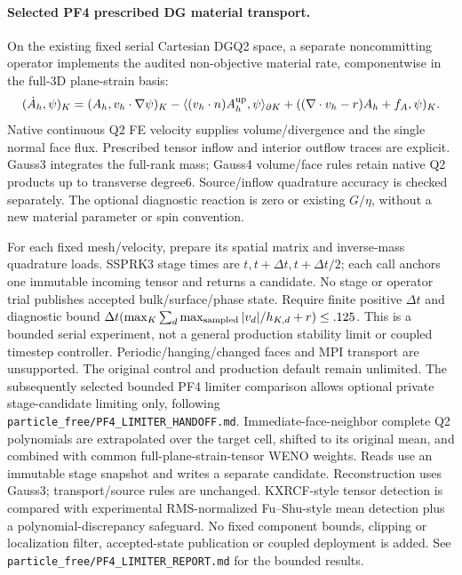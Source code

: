 \documentclass[11pt]{article}
\begin{document}
\paragraph{Selected PF4 prescribed DG material transport.}
On the existing fixed serial Cartesian DGQ2 space, a separate noncommitting
operator implements the audited non-objective material rate, componentwise in
the full-3D plane-strain basis:
\[
 (\dot A_h,\psi)_K=(A_h,v_h\cdot\nabla\psi)_K
 -\langle(v_h\cdot n)A_h^{\rm up},\psi\rangle_{\partial K}
 +((\nabla\cdot v_h-r)A_h+f_A,\psi)_K.
\]
Native continuous Q2 FE velocity supplies volume/divergence and the single
normal face flux. Prescribed tensor inflow and interior outflow traces are
explicit. Gauss3 integrates the full-rank mass; Gauss4 volume/face rules retain
native Q2 products up to transverse degree6. Source/inflow quadrature accuracy
is checked separately. The optional diagnostic reaction is zero or existing
$G/\eta$, without a new material parameter or spin convention.

For each fixed mesh/velocity, prepare its spatial matrix and inverse-mass
quadrature loads. SSPRK3 stage times are $t,t+\Delta t,t+\Delta t/2$; each call
anchors one immutable incoming tensor and returns a candidate. No stage or
operator trial publishes accepted bulk/surface/phase state. Require finite
positive $\Delta t$ and diagnostic bound
$\Delta t(\max_K\sum_d\max_{\rm sampled}|v_d|/h_{K,d}+r)\le .125$.
This is a bounded serial experiment, not a general production stability limit
or coupled timestep controller. Periodic/hanging/changed faces and MPI transport
are unsupported. The original control and production default remain unlimited.
The subsequently selected bounded PF4 limiter comparison allows optional private
stage-candidate limiting only, following
\texttt{particle\_free/PF4\_LIMITER\_HANDOFF.md}. Immediate-face-neighbor complete
Q2 polynomials are extrapolated over the target cell, shifted to its original
mean, and combined with common full-plane-strain-tensor WENO weights. Reads use
an immutable stage snapshot and writes a separate candidate. Reconstruction uses
Gauss3; transport/source rules are unchanged. KXRCF-style tensor detection is
compared with experimental RMS-normalized Fu--Shu-style mean detection plus a
polynomial-discrepancy safeguard. No fixed component bounds, clipping or
localization filter, accepted-state publication or coupled deployment is added.
See \texttt{particle\_free/PF4\_LIMITER\_REPORT.md} for the bounded results.
\end{document}
